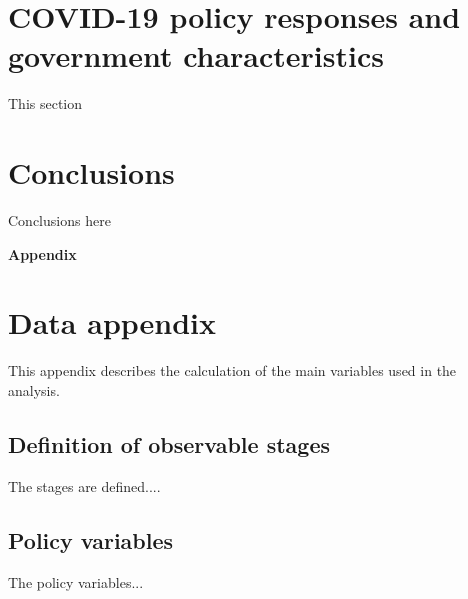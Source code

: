 \documentclass[12pt,english]{article}
\begin{document}

\section{COVID-19 policy responses and government characteristics \label{sec:Characteristics}}


This section 


\section{Conclusions\label{sec:Conclusion}}

Conclusions here

\pagebreak{}

\setlength\bibsep{0.65pt}
\setlength{\parskip}{0.1em}





\pagebreak{}



\appendix
\vphantom{}
\begin{center}
\textbf{\LARGE{}Appendix}
\par\end{center}{\LARGE \par}

\setcounter{figure}{0} \renewcommand{\thefigure}{A.\arabic{figure}}
\setcounter{table}{0} \renewcommand{\thetable}{A.\arabic{table}}


\section{Data appendix\label{sec:Figures}}
\begin{spacing}{0.40000000000000002}

This appendix describes the calculation of the main variables used in the analysis. 

\subsection{Definition of observable stages}

The stages are defined....

\subsection{Policy variables}

The policy variables...



\end{spacing}
\end{document}
